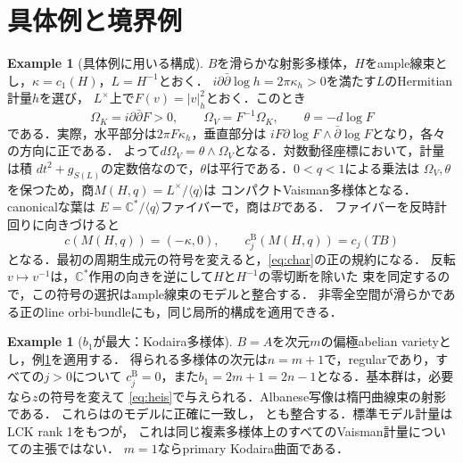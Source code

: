 \documentclass[12pt]{amsart}
\theoremstyle{definition}
\newtheorem{eg}[thm]{Example}
\theoremstyle{remark}
\numberwithin{equation}{section}
\newcommand{\C}{\mathbb{C}}
\newcommand{\bas}{\mathrm{B}}
\begin{document}
\section{具体例と境界例}\label{sec:examples}
\begin{eg}[具体例に用いる構成]\label{eg:construction}
$B$を滑らかな射影多様体，$H$をample線束とし，$\kappa=c_1(H)$，$L=H^{-1}$とおく．
$i\partial\bar\partial\log h=2\pi\kappa_h>0$を満たす$L$のHermitian計量$h$を選び，
$L^{\times}$上で$F(v)=|v|_h^2$とおく．このとき
\begin{equation}\label{eq:cone}
\Omega_K=i\partial\bar\partial F>0,\qquad
\Omega_V=F^{-1}\Omega_K,\qquad\theta=-d\log F
\end{equation}
である．実際，水平部分は$2\pi F\kappa_h$，垂直部分は
$iF\partial\log F\wedge\bar\partial\log F$となり，各々の方向に正である．
よって$d\Omega_V=\theta\wedge\Omega_V$となる．対数動径座標において，計量は積
$dt^2+g_{S(L)}$の定数倍なので，$\theta$は平行である．$0<q<1$による乗法は
$\Omega_V,\theta$を保つため，商$M(H,q)=L^{\times}/\langle q\rangle$は
コンパクトVaisman多様体となる．canonicalな葉は
$E=\C^*/\langle q\rangle$ファイバーで，商は$B$である．
ファイバーを反時計回りに向きづけると
\begin{equation}\label{eq:exchar}
c(M(H,q))=(-\kappa,0),\qquad
c_j^{\bas}(M(H,q))=c_j(TB)
\end{equation}
となる．最初の周期生成元の符号を変えると，\eqref{eq:char}の正の規約になる．
反転$v\mapsto v^{-1}$は，$\C^*$作用の向きを逆にして$H$と$H^{-1}$の零切断を除いた
束を同定するので，この符号の選択はample線束のモデルと整合する．
非零全空間が滑らかである正のline orbi-bundleにも，同じ局所的構成を適用できる．
\end{eg}

\begin{eg}[$b_1$が最大：Kodaira多様体]\label{eg:torus}
$B=A$を次元$m$の偏極abelian varietyとし，例\ref{eg:construction}を適用する．
得られる多様体の次元は$n=m+1$で，regularであり，すべての$j>0$について
$c_j^{\bas}=0$，また$b_1=2m+1=2n-1$となる．基本群は，必要なら$z$の符号を変えて
\eqref{eq:heis}で与えられる．Albanese写像は楕円曲線束の射影である．
これらは\cite[Example 7.2, Corollary 5.11]{Istrati}のモデルに正確に一致し，
\cite[Theorem 6.6]{Gomes}とも整合する．標準モデル計量はLCK rank 1をもつが，
これは同じ複素多様体上のすべてのVaisman計量についての主張ではない．
$m=1$ならprimary Kodaira曲面である．
\end{eg}
\end{document}
